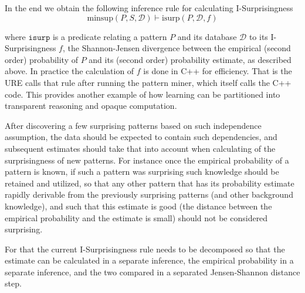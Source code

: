 \documentclass[runningheads]{llncs}
\begin{document}
In the end we obtain the following inference rule for calculating
I-Surprisingness
$$
\text{minsup}(P, S, \mathcal{D}) \vdash \text{isurp}(P, \mathcal{D}, f)
$$

where $\texttt{isurp}$ is a predicate relating a pattern $P$ and its
database $\mathcal{D}$ to its I-Surprisingness $f$, the Shannon-Jensen
divergence between the empirical (second order) probability of $P$ and
its (second order) probability estimate, as described above. In
practice the calculation of $f$ is done in C++ for efficiency. That is
the URE calls that rule after running the pattern miner, which itself
calls the C++ code. This provides another example of how learning can
be partitioned into transparent reasoning and opaque computation.

After discovering a few surprising patterns based on such independence
assumption, the data should be expected to contain such dependencies,
and subsequent estimates should take that into account when
calculating of the surprisingness of new patterns. For instance once
the empirical probability of a pattern is known, if such a pattern was
surprising such knowledge should be retained and utilized, so that any
other pattern that has its probability estimate rapidly derivable from
the previously surprising patterns (and other background knowledge),
and such that this estimate is good (the distance between the
empirical probability and the estimate is small) should not be
considered surprising.

For that the current I-Surprisingness rule needs to be decomposed so
that the estimate can be calculated in a separate inference, the
empirical probability in a separate inference, and the two compared in
a separated Jensen-Shannon distance step.

\end{document}
